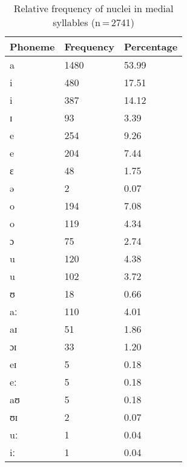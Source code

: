 \begin{table}[hp]\centering
\caption[Relative frequency of nuclei in medial syllables]{Relative frequency of nuclei in medial syllables (n\,=\,2741)}
\begin{tabu} to 0.5\textwidth{X X[c] X[c]}
\tableheaderfont\toprule
Phoneme
	& Frequency
	& Percentage
	\\
	
\toprule

a	&	1480	&	53.99\pct\\

\midrule

i	&	480	&	17.51\pct\\
\rowfont{\scriptsize\itshape}
\raggedleft
i	&	387	&	14.12\pct\\
\rowfont{\scriptsize\itshape}
\raggedleft
ɪ	&	93	&	3.39\pct\\

\midrule

e	&	254	&	9.26\pct\\
\rowfont{\scriptsize\itshape}
\raggedleft
e	&	204	&	7.44\pct\\
\rowfont{\scriptsize\itshape}
\raggedleft
ɛ	&	48	&	1.75\pct\\
\rowfont{\scriptsize\itshape}
\raggedleft
ə	&	2	&	0.07\pct\\

\midrule

o	&	194	&	7.08\pct\\
\rowfont{\scriptsize\itshape}
\raggedleft
o	&	119	&	4.34\pct\\
\rowfont{\scriptsize\itshape}
\raggedleft
ɔ	&	75	&	2.74\pct\\

\midrule

u	&	120	&	4.38\pct\\
\rowfont{\scriptsize\itshape}
\raggedleft
u	&	102	&	3.72\pct\\
\rowfont{\scriptsize\itshape}
\raggedleft
ʊ	&	18	&	0.66\pct\\

\midrule

aː	&	110	&	4.01\pct\\
aɪ	&	51	&	1.86\pct\\
ɔɪ	&	33	&	1.20\pct\\
eɪ	&	5	&	0.18\pct\\
eː	&	5	&	0.18\pct\\
aʊ	&	5	&	0.18\pct\\
ʊɪ	&	2	&	0.07\pct\\
uː	&	1	&	0.04\pct\\
iː	&	1	&	0.04\pct\\

\bottomrule
\end{tabu}
\label{tab:midnuc}
\end{table}

